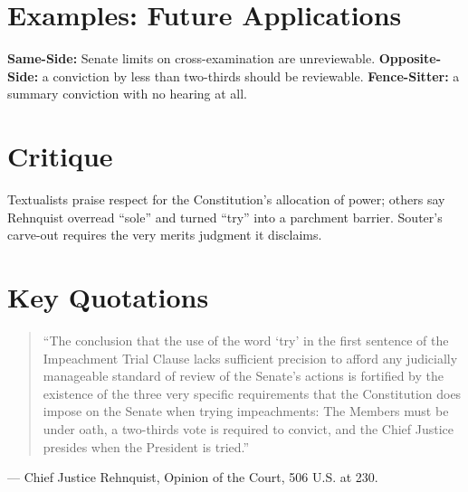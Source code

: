\documentclass[12pt]{article}
\begin{document}
\section{Examples: Future Applications}
\textbf{Same-Side:} Senate limits on cross-examination are unreviewable. \textbf{Opposite-Side:} a conviction by less than two-thirds should be reviewable. \textbf{Fence-Sitter:} a summary conviction with no hearing at all.

\section{Critique}
Textualists praise respect for the Constitution's allocation of power; others say Rehnquist overread ``sole'' and turned ``try'' into a parchment barrier. Souter's carve-out requires the very merits judgment it disclaims.

\section{Key Quotations}
\begin{quote}
``The conclusion that the use of the word `try' in the first sentence of the Impeachment Trial Clause lacks sufficient precision to afford any judicially manageable standard of review of the Senate's actions is fortified by the existence of the three very specific requirements that the Constitution does impose on the Senate when trying impeachments: The Members must be under oath, a two-thirds vote is required to convict, and the Chief Justice presides when the President is tried.''
\end{quote}
\noindent --- Chief Justice Rehnquist, Opinion of the Court, 506 U.S. at 230.
\end{document}
